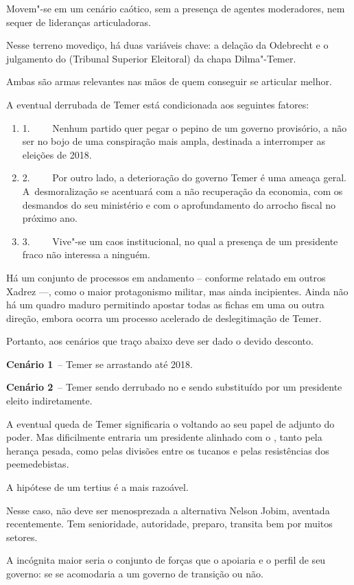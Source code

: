 Movem"-se em um cenário caótico, sem a presença de agentes moderadores,
nem sequer de lideranças articuladoras.

Nesse terreno movediço, há duas variáveis chave: a delação da Odebrecht
e o julgamento do  (Tribunal Superior Eleitoral) da chapa
Dilma"-Temer.

Ambas são armas relevantes nas mãos de quem conseguir se articular
melhor.

A eventual derrubada de Temer está condicionada aos seguintes fatores:

\begin{enumerate}
\itemsep1pt\parskip0pt
\item
  1.~~~~ Nenhum partido quer pegar o pepino de um governo provisório, a
  não ser no bojo de uma conspiração mais ampla, destinada a interromper
  as eleições de 2018.
\item
  2.~~~~ Por outro lado, a deterioração do governo Temer é uma ameaça
  geral. A~desmoralização se acentuará com a não recuperação da
  economia, com os desmandos do seu ministério e com o aprofundamento do
  arrocho fiscal no próximo ano.
\item
  3.~~~~ Vive"-se um caos institucional, no qual a presença de um
  presidente fraco não interessa a ninguém.
\end{enumerate}

Há um conjunto de processos em andamento -- conforme relatado em outros
Xadrez \mbox{---,} como o maior protagonismo militar, mas ainda incipientes.
Ainda não há um quadro maduro permitindo apostar todas as fichas em uma
ou outra direção, embora ocorra um processo acelerado de deslegitimação
de Temer.

Portanto, aos cenários que traço abaixo deve ser dado o devido desconto.

\textbf{Cenário 1}~-- Temer se arrastando até 2018.

\textbf{Cenário 2}~-- Temer sendo derrubado no  e sendo substituído
por um presidente eleito indiretamente.

A eventual queda de Temer significaria o  voltando ao seu papel de
adjunto do poder. Mas dificilmente entraria um presidente alinhado com o
, tanto pela herança pesada, como pelas divisões entre os tucanos e
pelas resistências dos peemedebistas.

A hipótese de um tertius é a mais razoável.

Nesse caso, não deve ser menosprezada a alternativa Nelson Jobim,
aventada recentemente. Tem senioridade, autoridade, preparo, transita
bem por muitos setores.

A incógnita maior seria o conjunto de forças que o apoiaria e o perfil
de seu governo: se se acomodaria a um governo de transição ou não.
